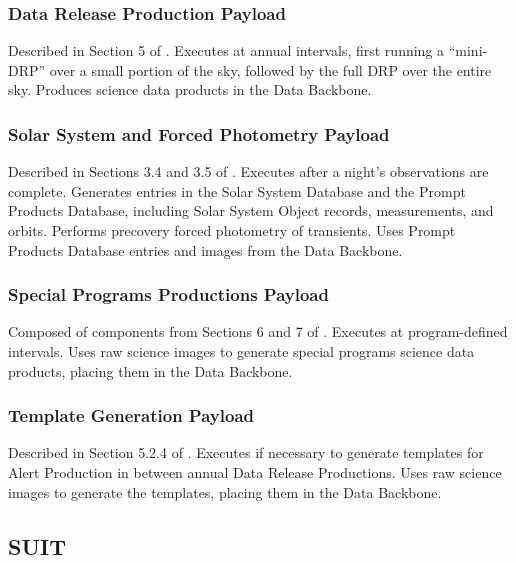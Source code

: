 \documentclass[DM,toc,lsstdraft]{lsstdoc}
\begin{document}
\subsubsection{Data Release Production
Payload}\label{data-release-production-payload}

Described in Section 5 of .
Executes at annual intervals,
first running a ``mini-DRP'' over a small portion of the sky, followed
by the full DRP over the entire sky. Produces science data products in
the Data Backbone.

\subsubsection{Solar System and Forced Photometry Payload}\label{solar-system-payload}

Described in Sections 3.4 and 3.5 of .
Executes after a night's
observations are complete. Generates entries in the Solar System Database and
the Prompt Products Database, including Solar System Object records,
measurements, and orbits. Performs precovery forced photometry of
transients. Uses Prompt Products Database entries and images from the Data
Backbone.

\subsubsection{Special Programs Productions
Payload}\label{special-programs-productions-payload}

Composed of components from Sections 6 and 7 of .
Executes at program-defined intervals.
Uses raw science images to generate special programs science data products, placing them in the Data Backbone.

\subsubsection{Template Generation
Payload}\label{template-generation-payload}

Described in Section 5.2.4 of .
Executes if necessary to generate templates for Alert Production in between annual
Data Release Productions. Uses raw science images to generate the
templates, placing them in the Data Backbone.

\subsection{SUIT}\label{suit}
\end{document}
